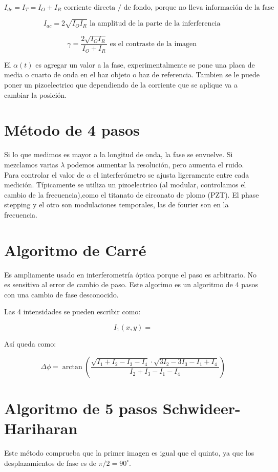 \documentclass[12pt, letterpaper]{article}
\begin{document}
	
	
	$$  I_{dc} = I_{T} = I_O + I_R  \text{ corriente directa / de fondo, porque no lleva información de la fase }$$
	
	$$ I_{ac} = 2\sqrt{I_OI_R} \text{ la amplitud de la parte de la inferferencia } $$
	
	$$ \gamma = \frac{2\sqrt{I_OI_R}}{I_O + I_R}  \text{ es el contraste de la imagen } $$
	
	El $\alpha(t)$ es agregar un valor a la fase, experimentalmente se pone una placa de media o cuarto de onda en el haz objeto o haz de referencia. Tambien se le puede poner un pizoelectrico que dependiendo de la corriente que se aplique va a cambiar la posición.
	
	
	\section*{Método de 4 pasos}
	
	Si lo que medimos es mayor a la longitud de onda, la fase se envuelve. Si mezclamos varias $\lambda$ podemos aumentar la resolución, pero aumenta el ruido.\\
	
	Para controlar el valor de $\alpha$ el interferómetro se ajusta ligeramente entre cada medición. Típicamente se utiliza un pizoelectrico (al modular, controlamos el cambio de la frecuencia),como el titanato de circonato de plomo (PZT). El phase stepping y el otro son modulaciones temporales, las de fourier son en la frecuencia.
	
	\section*{Algoritmo de Carré}
	Es ampliamente usado en interferometría óptica porque el paso es arbitrario. No es sensitivo al error de cambio de paso. Este algorimo es un algoritmo de 4 pasos con una cambio de fase desconocido.
	
	Las 4 intensidades se pueden escribir como:
	
	$$ I_1(x, y) =  $$
	
	Así queda como:
	
	$$\Delta \phi = \arctan\left(\frac{\sqrt{I_1 + I_2 - I_3 -I_4} \cdot \sqrt{3I_2-3I_3-I_1+I_4}}{I_2+I_3-I_1-I_4}\right)$$
	
	\section*{Algoritmo de 5 pasos Schwideer-Hariharan}
	Este método comprueba que la primer imagen es igual que el quinto, ya que los desplazamientos de fase es de $\pi/2 = 90^{\circ}$.
	
\end{document}
